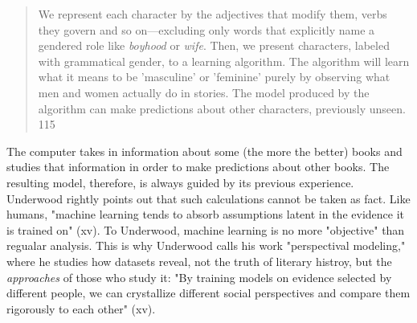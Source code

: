 \documentclass[11pt]{article}
\begin{document}
\begin{quote}
We represent each character by the adjectives that modify them, verbs
they govern and so on---excluding only words that explicitly name a
gendered role like \emph{boyhood} or \emph{wife}. Then, we present characters,
labeled with grammatical gender, to a learning algorithm. The
algorithm will learn what it means to be 'masculine' or 'feminine'
purely by observing what men and women actually do in stories. The model produced by the algorithm can make predictions about other
characters, previously unseen. 115
\end{quote}

The computer takes in information about some (the more the better)
books and studies that information in order to make predictions about
other books. The resulting model, therefore, is always guided by its
previous experience. Underwood rightly points out that such
calculations cannot be taken as fact. Like humans, "machine learning
tends to absorb assumptions latent in the evidence it is trained on"
(xv). To Underwood, machine learning is no more "objective" than
regualar analysis. This is why Underwood calls his work "perspectival
modeling," where he studies how datasets reveal, not the truth of
literary histroy, but the \emph{approaches} of those who study it: "By
training models on evidence selected by different people, we can
crystallize different social perspectives and compare them rigorously
to each other" (xv).
\end{document}
